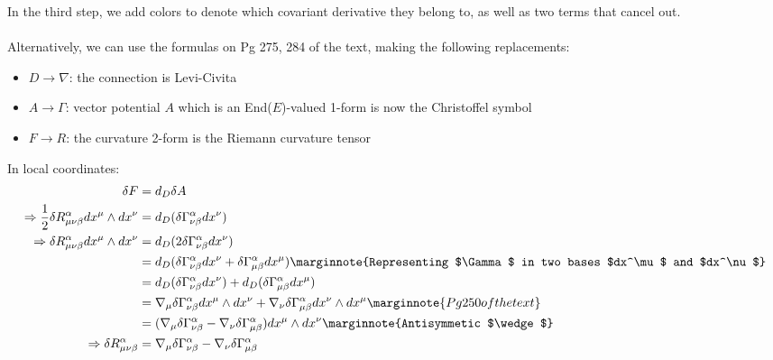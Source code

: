 \documentclass[10pt]{article}
\begin{document}
In the third step, we add colors to denote which covariant derivative they belong to, as well as two terms that cancel out.\\\\
Alternatively, we can use the formulas on Pg 275, 284 of the text, making the following replacements:
\begin{itemize}
	\item $D\to\nabla$: the connection is Levi-Civita
	\item $A\to\Gamma$: vector potential $A$ which is an End($E$)-valued 1-form is now the Christoffel symbol
	\item $F\to R$: the curvature 2-form is the Riemann curvature tensor
\end{itemize}
In local coordinates:
$$
\begin{aligned}
	\delta F &= d_D\delta A\\
	\Rightarrow \frac12 \delta R_{\mu\nu\beta}^\alpha dx^\mu \wedge dx^\nu &= d_D(\delta \Gamma_{\nu\beta}^\alpha dx^\nu)\\
	\Rightarrow \delta R_{\mu\nu\beta}^\alpha dx^\mu \wedge dx^\nu &= d_D(2\delta \Gamma_{\nu\beta}^\alpha dx^\nu)\\
	&= d_D(\delta \Gamma_{\nu\beta}^\alpha dx^\nu + \delta \Gamma_{\mu\beta}^\alpha dx^\mu)\marginnote{Representing $\Gamma$ in two bases $dx^\mu$ and $dx^\nu$}\\
	&= d_D(\delta \Gamma_{\nu\beta}^\alpha dx^\nu) + d_D(\delta \Gamma_{\mu\beta}^\alpha dx^\mu)\\
	&= \nabla_\mu\delta \Gamma_{\nu\beta}^\alpha dx^\mu \wedge dx^\nu + \nabla_\nu\delta \Gamma_{\mu\beta}^\alpha dx^\nu \wedge dx^\mu\marginnote{Pg 250 of the text}\\
	&= (\nabla_\mu\delta \Gamma_{\nu\beta}^\alpha - \nabla_\nu\delta \Gamma_{\mu\beta}^\alpha)dx^\mu \wedge dx^\nu\marginnote{Antisymmetic $\wedge$}\\
	\Rightarrow \delta R_{\mu\nu\beta}^\alpha &= \nabla_\mu\delta\Gamma_{\nu\beta}^\alpha - \nabla_\nu\delta\Gamma_{\mu\beta}^\alpha
\end{aligned}
$$
\end{document}
